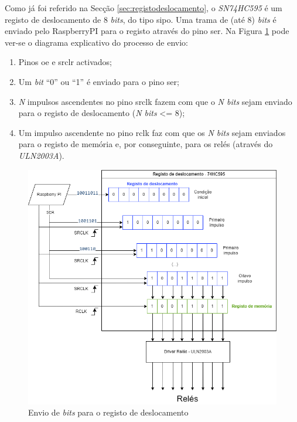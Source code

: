 Como já foi referido na Secção \ref{sec:registodeslocamento}, o \textit{SN74HC595} é um registo de deslocamento de 8 \textit{bits}, do tipo \acrshort{sipo}. Uma trama de (até 8) \textit{bits} é enviado pelo \gls{RaspberryPI} para o registo através do pino \acrshort{ser}. Na Figura \ref{fig:esquematico74hc595} pode ver-se o diagrama explicativo do processo de envio:

\begin{enumerate}
	\item Pinos \acrshort{oe} e \acrshort{srclr} activados;
	\item Um \textit{bit} ``0'' ou ``1'' é enviado para o pino \acrshort{ser};
	\item \textit{N} impulsos ascendentes no pino \acrshort{srclk} fazem com que o \textit{N bits} sejam enviado para o registo de deslocamento (\textit{N bits} <= 8);
	\item Um impulso ascendente no pino \acrshort{rclk} faz com que os \textit{N bits} sejam enviados para o registo de memória e, por conseguinte, para os relés (através do \textit{ULN2003A}).
\end{enumerate}


\begin{figure}[hbtp]
	\centering
	\includegraphics[width=1\textwidth]{figures/registo deslocamente.drawio.png}
	\caption{Envio de \textit{bits} para o registo de deslocamento}
	\label{fig:esquematico74hc595}
\end{figure}

